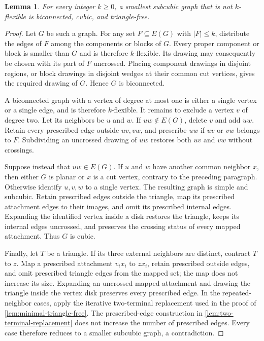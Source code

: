 \documentclass[a4paper,11pt]{article}
\theoremstyle{plain}
\newtheorem{lemma}{Lemma}
\theoremstyle{definition}  %
\begin{document}
\begin{lemma}
    \label{lem:flexibility-core}
    For every integer $k\geq 0$, a smallest subcubic graph that is not
    $k$-flexible is biconnected, cubic, and triangle-free.
\end{lemma}

\begin{proof}
    Let $G$ be such a graph.  For any set $F\subseteq E(G)$ with $|F|\leq k$,
    distribute the edges of $F$ among the components or blocks of $G$.  Every
    proper component or block is smaller than $G$ and is therefore
    $k$-flexible.  Its drawing may consequently be chosen with its part of
    $F$ uncrossed.  Placing component drawings in disjoint regions, or block
    drawings in disjoint wedges at their common cut vertices, gives the
    required drawing of $G$.  Hence $G$ is biconnected.

    A biconnected graph with a vertex of degree at most one is either a single
    vertex or a single edge, and is therefore $k$-flexible.  It remains to
    exclude a vertex $v$ of degree two.  Let its neighbors be
    $u$ and $w$.  If $uw\notin E(G)$, delete $v$ and add $uw$.  Retain every
    prescribed edge outside $uv,vw$, and prescribe $uw$ if $uv$ or $vw$
    belongs to $F$.  Subdividing an uncrossed drawing of $uw$ restores both
    $uv$ and $vw$ without crossings.

    Suppose instead that $uw\in E(G)$.  If $u$ and $w$ have another common
    neighbor $x$, then either $G$ is planar or $x$ is a cut vertex, contrary
    to the preceding paragraph.  Otherwise identify $u,v,w$ to a single
    vertex.  The resulting graph is simple and subcubic.  Retain prescribed
    edges outside the triangle, map its prescribed attachment edges to their
    images, and omit its prescribed internal edges.  Expanding the identified
    vertex inside a disk restores the triangle, keeps its internal edges
    uncrossed, and preserves the crossing status of every mapped attachment.
    Thus $G$ is cubic.

    Finally, let $T$ be a triangle.  If its three external neighbors are
    distinct, contract $T$ to $z$.  Map a prescribed attachment $v_ix_i$ to
    $zx_i$, retain prescribed outside edges, and omit prescribed triangle
    edges from the mapped set; the map does not increase its size.  Expanding
    an uncrossed mapped attachment and drawing the triangle inside the vertex
    disk preserves every prescribed edge.  In the repeated-neighbor cases,
    apply the iterative two-terminal replacement used in the proof of
    \cref{lem:minimal-triangle-free}.  The prescribed-edge construction in
    \cref{lem:two-terminal-replacement} does not increase the number of
    prescribed edges.  Every case therefore reduces to a smaller subcubic
    graph, a contradiction.
\end{proof}
\end{document}
